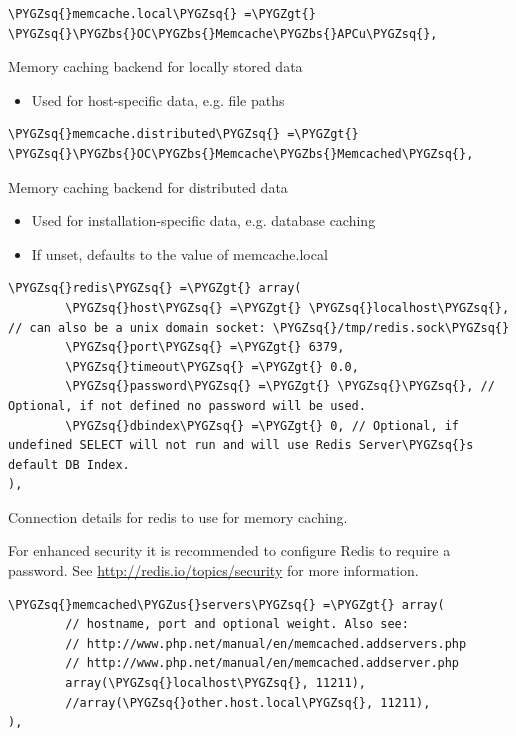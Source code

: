 \documentclass[letterpaper,10pt,english]{sphinxmanual}
\def\PYGZbs{\char`\\}
\def\PYGZus{\char`\_}
\def\PYGZgt{\char`\>}
\def\PYGZsq{\char`\'}
\renewcommand\PYGZsq{\textquotesingle}
\begin{document}
\begin{Verbatim}[commandchars=\\\{\}]
\PYGZsq{}memcache.local\PYGZsq{} =\PYGZgt{} \PYGZsq{}\PYGZbs{}OC\PYGZbs{}Memcache\PYGZbs{}APCu\PYGZsq{},
\end{Verbatim}

Memory caching backend for locally stored data
\begin{itemize}
\item {} 
Used for host-specific data, e.g. file paths

\end{itemize}

\begin{Verbatim}[commandchars=\\\{\}]
\PYGZsq{}memcache.distributed\PYGZsq{} =\PYGZgt{} \PYGZsq{}\PYGZbs{}OC\PYGZbs{}Memcache\PYGZbs{}Memcached\PYGZsq{},
\end{Verbatim}

Memory caching backend for distributed data
\begin{itemize}
\item {} 
Used for installation-specific data, e.g. database caching

\item {} 
If unset, defaults to the value of memcache.local

\end{itemize}

\begin{Verbatim}[commandchars=\\\{\}]
\PYGZsq{}redis\PYGZsq{} =\PYGZgt{} array(
        \PYGZsq{}host\PYGZsq{} =\PYGZgt{} \PYGZsq{}localhost\PYGZsq{}, // can also be a unix domain socket: \PYGZsq{}/tmp/redis.sock\PYGZsq{}
        \PYGZsq{}port\PYGZsq{} =\PYGZgt{} 6379,
        \PYGZsq{}timeout\PYGZsq{} =\PYGZgt{} 0.0,
        \PYGZsq{}password\PYGZsq{} =\PYGZgt{} \PYGZsq{}\PYGZsq{}, // Optional, if not defined no password will be used.
        \PYGZsq{}dbindex\PYGZsq{} =\PYGZgt{} 0, // Optional, if undefined SELECT will not run and will use Redis Server\PYGZsq{}s default DB Index.
),
\end{Verbatim}

Connection details for redis to use for memory caching.

For enhanced security it is recommended to configure Redis
to require a password. See \href{http://redis.io/topics/security}{http://redis.io/topics/security}
for more information.

\begin{Verbatim}[commandchars=\\\{\}]
\PYGZsq{}memcached\PYGZus{}servers\PYGZsq{} =\PYGZgt{} array(
        // hostname, port and optional weight. Also see:
        // http://www.php.net/manual/en/memcached.addservers.php
        // http://www.php.net/manual/en/memcached.addserver.php
        array(\PYGZsq{}localhost\PYGZsq{}, 11211),
        //array(\PYGZsq{}other.host.local\PYGZsq{}, 11211),
),
\end{Verbatim}
\end{document}
